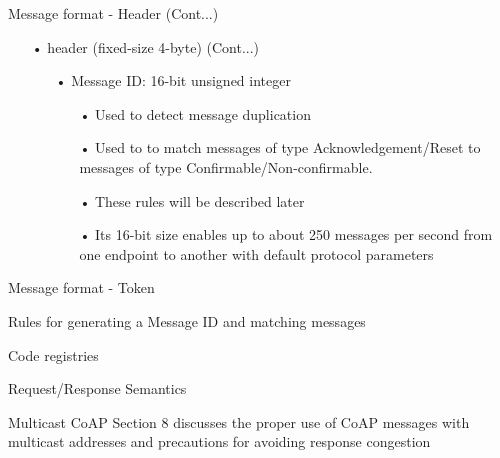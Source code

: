 \documentclass[11pt]{beamer}
\begin{document}
\begin{frame}{Message format - Header (Cont...)}
\begin{itemize}
\item[•] header (fixed-size 4-byte) (Cont...)
\begin{itemize}
\item[•] Message ID:  16-bit unsigned integer
\begin{itemize}
\item[•] Used to detect message duplication
\item[•] Used to to match messages of type Acknowledgement/Reset to messages of type Confirmable/Non-confirmable.
\item[•] These rules will be described later
\item[•] Its 16-bit size enables up to about 250 messages per second from one endpoint to another with default protocol parameters
\end{itemize}
\end{itemize}
\end{itemize}
\end{frame}
\begin{frame}{Message format - Token}

\end{frame}
\begin{frame}{Rules for generating a Message ID and matching messages}

\end{frame}
\begin{frame}{Code registries}

\end{frame}
\begin{frame}{Request/Response Semantics}

\end{frame}
\begin{frame}{Multicast CoAP}
Section 8 discusses the proper use of CoAP messages with multicast addresses and precautions for avoiding response congestion
\end{frame}
\end{document}
